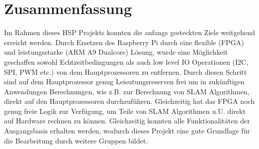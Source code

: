 \chapter{Zusammenfassung}
Im Rahmen dieses HSP Projekts konnten die anfangs gesteckten Ziele weitgehend erreicht werden. Durch Ersetzen des Raspberry Pi durch eine flexible (FPGA) und leistungsstarke (ARM A9 Dualcore) Lösung, wurde eine Möglichkeit geschaffen sowohl Echtzeitbedingungen als auch low level IO Operationen (I2C, SPI, PWM etc.) von dem Hauptprozessoren zu entfernen. Durch diesen Schritt sind auf dem Hauptprozessor genug Leisutungsreserven frei um in zukünftigen Anwendungen Berechnungen, wie z.B. zur Berechnung von SLAM Algorithmen, direkt auf den Hauptprozessoren durchzuführen. Gleichzeitig hat das FPGA noch genug freie Logik zur Verfügung, um Teile von SLAM Algorithmen u.U. direkt auf Hardware rechnen zu können. Gleichzeitig konnten alle Funktionalitäten der Ausgangsbasis erhalten werden, wodurch dieses Projekt eine gute Grundlage für die Bearbeitung durch weitere Gruppen bildet.
